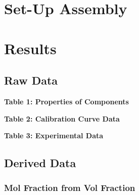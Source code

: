 \documentclass[11pt]{article}
\begin{document}
\hypertarget{set-up-assembly}{%
  \section{Set-Up Assembly}\label{set-up-assembly}}

\begin{center}
\end{center}
\pagebreak

\hypertarget{results}{%
  \section{Results}\label{results}}

\hypertarget{raw-data}{%
  \subsection{Raw Data}\label{raw-data}}

\textbf{Table 1: Properties of Components}

\begin{center}
\end{center}

\textbf{Table 2: Calibration Curve Data}

\begin{center}
\end{center}

\textbf{Table 3: Experimental Data}

\begin{center}
\end{center}

\pagebreak
\hypertarget{derived-data}{%
  \subsection{Derived Data}\label{derived-data}}

\hypertarget{mol-fraction-from-vol-fraction}{%
  \subsubsection{Mol Fraction from Vol
    Fraction}\label{mol-fraction-from-vol-fraction}}
\end{document}
